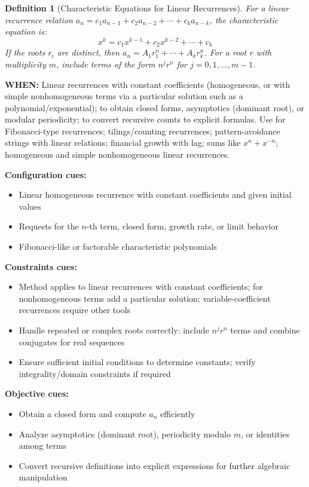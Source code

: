 \documentclass[12pt]{article}
\newtheorem{definition}{Definition}[section]
\begin{document}
\begin{definition}[Characteristic Equations for Linear Recurrences]
For a linear recurrence relation $a_n = c_1a_{n-1} + c_2a_{n-2} + \cdots + c_ka_{n-k}$, the characteristic equation is:
\[
x^k = c_1x^{k-1} + c_2x^{k-2} + \cdots + c_k
\]
If the roots $r_i$ are distinct, then $a_n = A_1r_1^n + \cdots + A_kr_k^n$. For a root $r$ with multiplicity $m$, include terms of the form $n^j r^n$ for $j=0,1,\dots,m-1$.
\end{definition}

\textbf{WHEN:} Linear recurrences with constant coefficients (homogeneous, or with simple nonhomogeneous terms via a particular solution such as a polynomial/exponential); to obtain closed forms, asymptotics (dominant root), or modular periodicity; to convert recursive counts to explicit formulas. Use for Fibonacci-type recurrences; tilings/counting recurrences; pattern-avoidance strings with linear relations; financial growth with lag; sums like $x^n+x^{-n}$; homogeneous and simple nonhomogeneous linear recurrences.

\textbf{Configuration cues:}
\begin{itemize}
    \item Linear homogeneous recurrence with constant coefficients and given initial values
    \item Requests for the $n$-th term, closed form, growth rate, or limit behavior
    \item Fibonacci-like or factorable characteristic polynomials
\end{itemize}

\textbf{Constraints cues:}
\begin{itemize}
    \item Method applies to linear recurrences with constant coefficients; for nonhomogeneous terms add a particular solution; variable-coefficient recurrences require other tools
    \item Handle repeated or complex roots correctly: include $n^j r^n$ terms and combine conjugates for real sequences
    \item Ensure sufficient initial conditions to determine constants; verify integrality/domain constraints if required
\end{itemize}

\textbf{Objective cues:}
\begin{itemize}
    \item Obtain a closed form and compute $a_n$ efficiently
    \item Analyze asymptotics (dominant root), periodicity modulo $m$, or identities among terms
    \item Convert recursive definitions into explicit expressions for further algebraic manipulation
\end{itemize}
\end{document}
